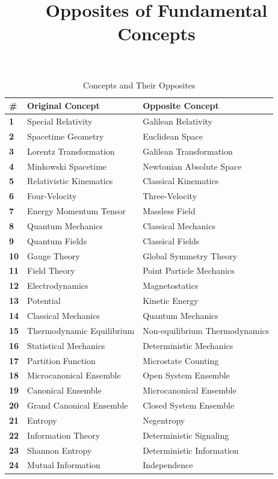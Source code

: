 \documentclass{article}
\title{Opposites of Fundamental Concepts}
\author{}
\date{}
\begin{document}
\maketitle

\begin{table}[h]
\centering
\caption{Concepts and Their Opposites}
\begin{tabular}{>{\bfseries}lll}
\toprule
\textbf{\#} & \textbf{Original Concept} & \textbf{Opposite Concept} \\
\midrule
1 & Special Relativity & Galilean Relativity \\
2 & Spacetime Geometry & Euclidean Space \\
3 & Lorentz Transformation & Galilean Transformation \\
4 & Minkowski Spacetime & Newtonian Absolute Space \\
5 & Relativistic Kinematics & Classical Kinematics \\
6 & Four-Velocity & Three-Velocity \\
7 & Energy Momentum Tensor & Massless Field \\
8 & Quantum Mechanics & Classical Mechanics \\
9 & Quantum Fields & Classical Fields \\
10 & Gauge Theory & Global Symmetry Theory \\
11 & Field Theory & Point Particle Mechanics \\
12 & Electrodynamics & Magnetostatics \\
13 & Potential & Kinetic Energy \\
14 & Classical Mechanics & Quantum Mechanics \\
15 & Thermodynamic Equilibrium & Non-equilibrium Thermodynamics \\
16 & Statistical Mechanics & Deterministic Mechanics \\
17 & Partition Function & Microstate Counting \\
18 & Microcanonical Ensemble & Open System Ensemble \\
19 & Canonical Ensemble & Microcanonical Ensemble \\
20 & Grand Canonical Ensemble & Closed System Ensemble \\
21 & Entropy & Negentropy \\
22 & Information Theory & Deterministic Signaling \\
23 & Shannon Entropy & Deterministic Information \\
24 & Mutual Information & Independence \\

\end{tabular}
\end{table}
\end{document}
